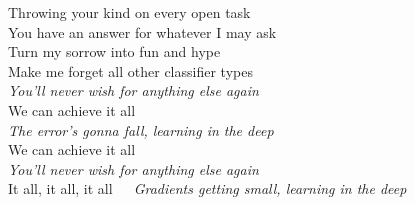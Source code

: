 
Throwing your kind on every open task\\
You have an answer for whatever I may ask\\
Turn my sorrow into fun and hype\\
Make me forget all other classifier types\\

\textit{You’ll never wish for anything else again}\\
We can achieve it all\\
\textit{The error’s gonna fall, learning in the deep}\\
We can achieve it all\\
\textit{You’ll never wish for anything else again}\\
It all, it all, it all\ \ \ \textit{Gradients getting small, learning in the deep}\\

 {}\pagebreak
